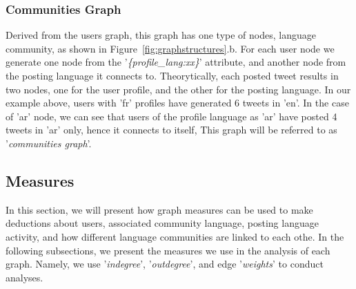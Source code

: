 \documentclass{llncs}
\begin{document}
\subsubsection{Communities Graph} \label{communitiesgraph}
Derived from the users graph, this graph has one type of nodes, language community,
as shown in Figure~\ref{fig:graphstructures}.b. For each user node we generate one 
node from the '{\emph{\{profile\_lang:xx\}}}' attribute, and another node from the posting 
language it connects to. Theorytically, each posted tweet results in two nodes, one for 
the user profile, and the other for the posting language. In our example above, users 
with 'fr' profiles have generated 6 tweets in 'en'. In the case of 'ar' node, we can see that 
users of the profile language as 'ar' have posted 4 tweets in 'ar' only, hence it connects to itself,
This graph will be referred to as '\emph{communities graph}'.

\subsection{Measures}
In this section, we will present how graph measures can be used to 
make deductions about users, associated community language, posting language
activity, and how different language communities are linked to each othe. 
In the following subsections, we present the measures we use in the analysis 
of each graph. Namely, we use '\emph{indegree}', '\emph{outdegree}', and edge 
'\emph{weights}' to conduct analyses.
\end{document}
